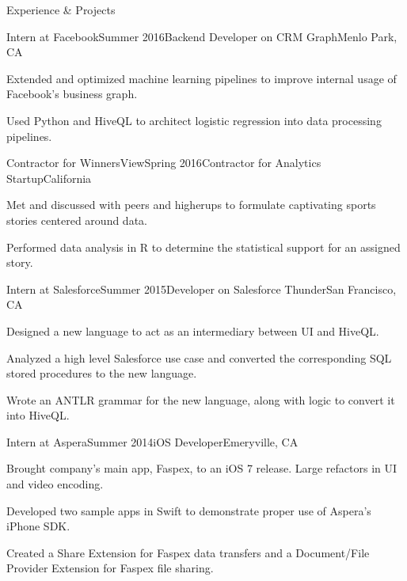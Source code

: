 \documentclass{resume} %
\begin{document}

\begin{rSection}{Experience \& Projects}

\begin{rSubsection}{Intern at Facebook}{Summer 2016}{Backend Developer on CRM Graph}{Menlo Park, CA}
\item Extended and optimized machine learning pipelines to improve internal 
usage of Facebook's business graph.
\item Used Python and HiveQL to architect logistic regression into data 
processing pipelines.
\end{rSubsection}

\begin{rSubsection}{Contractor for WinnersView}{Spring 2016}{Contractor for Analytics Startup}{California}
\item Met and discussed with peers and higherups to formulate captivating 
sports stories centered around data.
\item Performed data analysis in R to determine the statistical support for 
an assigned story.
\end{rSubsection}

\begin{rSubsection}{Intern at Salesforce}{Summer 2015}{Developer on Salesforce Thunder}{San Francisco, CA}
\item Designed a new language to act as an intermediary between UI and HiveQL.
\item Analyzed a high level Salesforce use case and converted the corresponding SQL stored procedures to
the new language.
\item Wrote an ANTLR grammar for the new language, along with logic to convert it into HiveQL.
\end{rSubsection}


\begin{rSubsection}{Intern at Aspera}{Summer 2014}{iOS Developer}{Emeryville, CA}
\item Brought company's main app, Faspex, to an iOS 7 release. Large refactors in
    UI and video encoding.
\item Developed two sample apps in Swift to demonstrate proper use of Aspera's iPhone
    SDK.
\item Created a Share Extension for Faspex data transfers and a Document/File Provider Extension
    for Faspex file sharing.
\end{rSubsection}


\end{rSection}
\end{document}
